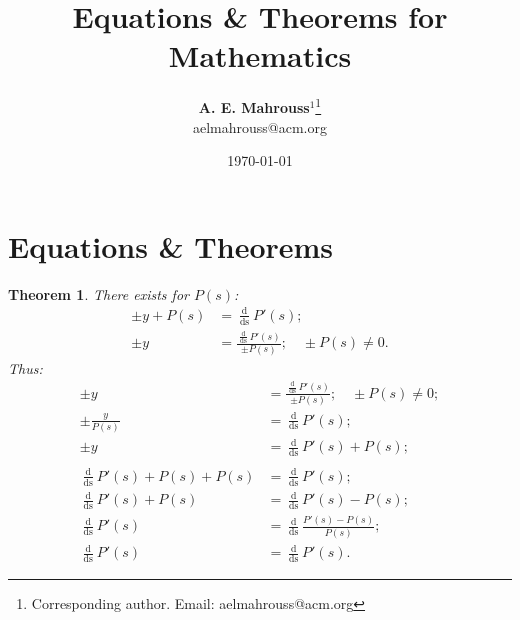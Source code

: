 \documentclass[10pt, twocolumn]{article}
\title{%
  \vspace{-1.5em}%
  \large\textbf{Equations \& Theorems for Mathematics}%
}
\author{%
  \textbf{A. E. Mahrouss}$^{1}$\thanks{Corresponding author. Email: aelmahrouss@acm.org}
  \\aelmahrouss@acm.org\\[0.4em]
}
\date{%
  \small \today
}
\theoremstyle{plain}
\newtheorem{theorem}{Theorem}[section]
\theoremstyle{definition}
\theoremstyle{remark}
\begin{document}

\twocolumn[{%
  \maketitle
  \vspace{-0.5em}
  \vspace{0.8em}
  \rule{\linewidth}{0.4pt}
  \vspace{1em}
}]


\section{Equations \& Theorems}

\begin{theorem}
	There exists for $P(s)$:
	\begin{align*}
		\pm y + P(s) &= \frac{\operatorname{d}}{\operatorname{ds}} P'(s);\\
		\pm y &= \frac{\frac{\operatorname{d}}{\operatorname{ds}} P'(s)}{\pm P(s)}; \quad \pm P(s) \neq 0.
	\end{align*}
	Thus:
	\begin{align*}
		\pm y &= \frac{\frac{\operatorname{d}}{\operatorname{ds}}  P'(s)}{\pm P(s)}; \quad \pm P(s) \neq 0;\\
		\pm \frac{y}{P(s)} &= \frac{\operatorname{d}}{\operatorname{ds}} P'(s);\\
		\pm y &= \frac{\operatorname{d}}{\operatorname{ds}} P'(s) + P(s);\\\\
		\frac{\operatorname{d}}{\operatorname{ds}} P'(s) + P(s) + P(s) &= \frac{\operatorname{d}}{\operatorname{ds}} P'(s);\\
		\frac{\operatorname{d}}{\operatorname{ds}} P'(s) + P(s) &= \frac{\operatorname{d}}{\operatorname{ds}} P'(s) - P(s);\\
		\frac{\operatorname{d}}{\operatorname{ds}} P'(s) &= \frac{\operatorname{d}}{\operatorname{ds}}\frac{ P'(s) - P(s)}{ P(s)};\\
		\frac{\operatorname{d}}{\operatorname{ds}} P'(s) &= \frac{\operatorname{d}}{\operatorname{ds}} P'(s).
	\end{align*}
\end{theorem}

\nocite{*}



\end{document}
